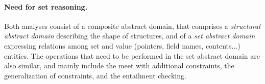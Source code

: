 \paragraph{Need for set reasoning.}
Both analyses consist of a composite abstract domain, that comprises a
{\em structural abstract domain} describing the shape of structures, and
of a {\em set abstract domain} expressing relations among set and value
(pointers, field names, contents...) entities.
The operations that need to be performed in the set abstract domain are
also similar, and mainly include the meet with additional constraints,
the generalization of constraints, and the entailment checking.


